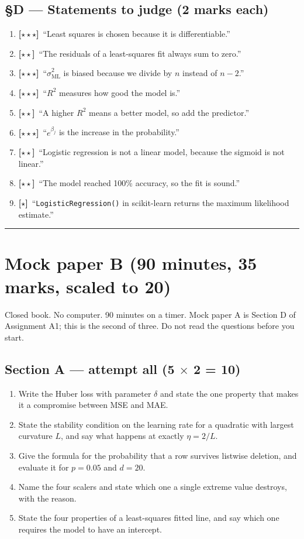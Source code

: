 \documentclass[11pt,a4paper]{article}
\newcommand{\LA}{{\footnotesize\textbf{[$\star\star\star$]}}}
\newcommand{\LB}{{\footnotesize\textbf{[$\star\star$]}}}
\newcommand{\LC}{{\footnotesize\textbf{[$\star$]}}}
\newcommand{\Q}[1]{\item[\textbf{#1}]}
\begin{document}
\subsection*{§D --- Statements to judge (2 marks each)}

\begin{enumerate}[leftmargin=2.2cm]
\Q{U5.76}\LA\ ``Least squares is chosen because it is differentiable.''
\Q{U5.77}\LB\ ``The residuals of a least-squares fit always sum to zero.''
\Q{U5.78}\LA\ ``$\hat\sigma^2_{\text{ML}}$ is biased because we divide by $n$
  instead of $n-2$.''
\Q{U5.79}\LA\ ``$R^2$ measures how good the model is.''
\Q{U5.80}\LB\ ``A higher $R^2$ means a better model, so add the predictor.''
\Q{U5.81}\LA\ ``$e^{\beta_j}$ is the increase in the probability.''
\Q{U5.82}\LB\ ``Logistic regression is not a linear model, because the sigmoid
  is not linear.''
\Q{U5.83}\LB\ ``The model reached 100\% accuracy, so the fit is sound.''
\Q{U5.84}\LC\ ``\texttt{LogisticRegression()} in scikit-learn returns the
  maximum likelihood estimate.''
\end{enumerate}

\vspace{0.6em}\hrule\vspace{0.4em}

\section*{Mock paper B \quad (90 minutes, 35 marks, scaled to 20)}

\begin{warnbox}
Closed book. No computer. 90 minutes on a timer. Mock paper A is Section D of
Assignment A1; this is the second of three. Do not read the questions before
you start.
\end{warnbox}

\subsection*{Section A --- attempt all \quad (5 $\times$ 2 = 10)}

\begin{enumerate}[label=\textbf{\arabic*.}, leftmargin=*]
\item Write the Huber loss with parameter $\delta$ and state the one property
  that makes it a compromise between MSE and MAE. 
\item State the stability condition on the learning rate for a quadratic with
  largest curvature $L$, and say what happens at exactly $\eta = 2/L$.
\item Give the formula for the probability that a row survives listwise
  deletion, and evaluate it for $p = 0.05$ and $d = 20$. 
\item Name the four scalers and state which one a single extreme value
  destroys, with the reason. 
\item State the four properties of a least-squares fitted line, and say which
  one requires the model to have an intercept. 
\end{enumerate}
\end{document}
